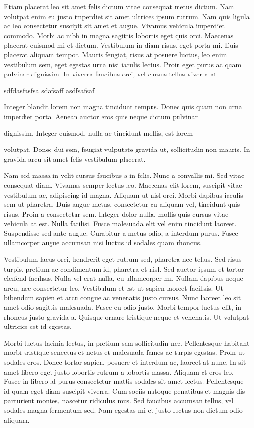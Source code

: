 \startrule
Etiam placerat leo sit amet felis dictum vitae consequat metus
dictum. Nam volutpat enim eu justo imperdiet sit amet ultrices ipsum
rutrum. Nam quis ligula ac leo consectetur suscipit sit amet et
augue. Vivamus vehicula imperdiet commodo. Morbi ac nibh in magna
sagittis lobortis eget quis orci. Maecenas placerat euismod mi et
dictum. Vestibulum in diam risus, eget porta mi. Duis placerat aliquam
tempor. Mauris feugiat, risus at posuere luctus, leo enim vestibulum
sem, eget egestas urna nisi iaculis lectus. Proin eget purus ac quam
pulvinar dignissim. In viverra faucibus orci, vel cursus tellus
viverra at.
\endrule

sdfdasfasfsa sdafsaff asdfsafsaf

\startrule\obeylines\raggedright\parindent=0pt %
Integer blandit lorem non magna tincidunt tempus. Donec quis quam non
urna imperdiet porta. Aenean auctor eros quis neque dictum pulvinar

dignissim. Integer euismod, nulla ac tincidunt mollis, est lorem

volutpat. Donec dui sem, feugiat vulputate gravida ut, sollicitudin
non mauris. In gravida arcu sit amet felis vestibulum placerat.
\endrule

Nam sed massa in velit cursus faucibus a in felis. Nunc a convallis
mi. Sed vitae consequat diam. Vivamus semper lectus leo. Maecenas elit
lorem, suscipit vitae vestibulum ac, adipiscing id magna. Aliquam ut
nisl orci. Morbi dapibus iaculis sem ut pharetra. Duis augue metus,
consectetur eu aliquam vel, tincidunt quis risus. Proin a consectetur
sem. Integer dolor nulla, mollis quis cursus vitae, vehicula at
est. Nulla facilisi. Fusce malesuada elit vel enim tincidunt
laoreet. Suspendisse sed ante augue. Curabitur a metus odio, a
interdum purus. Fusce ullamcorper augue accumsan nisi luctus id
sodales quam rhoncus.

\startrule
Vestibulum lacus orci, hendrerit eget rutrum sed, pharetra nec
tellus. Sed risus turpis, pretium ac condimentum id, pharetra et
nisl. Sed auctor ipsum et tortor eleifend facilisis. Nulla vel erat
nulla, eu ullamcorper mi. Nullam dapibus neque arcu, nec consectetur
leo. Vestibulum et est ut sapien laoreet facilisis. Ut bibendum sapien
et arcu congue ac venenatis justo cursus. Nunc laoreet leo sit amet
odio sagittis malesuada. Fusce eu odio justo. Morbi tempor luctus
elit, in rhoncus justo gravida a. Quisque ornare tristique neque et
venenatis. Ut volutpat ultricies est id egestas.
\endrule

\startrule
Morbi luctus lacinia lectus, in pretium sem sollicitudin
nec. Pellentesque habitant morbi tristique senectus et netus et
malesuada fames ac turpis egestas. Proin ut sodales eros. Donec tortor
sapien, posuere et interdum ac, laoreet at nunc. In sit amet libero
eget justo lobortis rutrum a lobortis massa. Aliquam et eros
leo. Fusce in libero id purus consectetur mattis sodales sit amet
lectus. Pellentesque id quam eget diam suscipit viverra. Cum sociis
natoque penatibus et magnis dis parturient montes, nascetur ridiculus
mus. Sed faucibus accumsan tellus, vel sodales magna fermentum
sed. Nam egestas mi et justo luctus non dictum odio aliquam.

